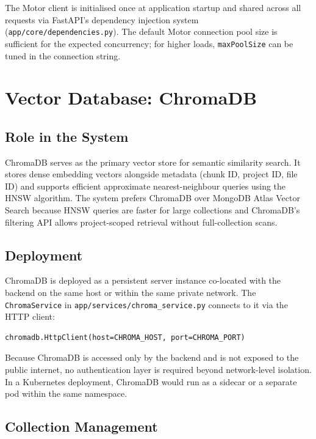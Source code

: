 The Motor client is initialised once at application startup and shared across all requests via FastAPI's dependency injection system (\texttt{app/core/dependencies.py}). The default Motor connection pool size is sufficient for the expected concurrency; for higher loads, \texttt{maxPoolSize} can be tuned in the connection string.

\section{Vector Database: ChromaDB}
\label{sec:chromadb}

\subsection{Role in the System}

ChromaDB serves as the primary vector store for semantic similarity search. It stores dense embedding vectors alongside metadata (chunk ID, project ID, file ID) and supports efficient approximate nearest-neighbour queries using the HNSW algorithm. The system prefers ChromaDB over MongoDB Atlas Vector Search because HNSW queries are faster for large collections and ChromaDB's filtering API allows project-scoped retrieval without full-collection scans.

\subsection{Deployment}

ChromaDB is deployed as a persistent server instance co-located with the backend on the same host or within the same private network. The \texttt{ChromaService} in \texttt{app/services/chroma\_service.py} connects to it via the HTTP client:

\begin{verbatim}
chromadb.HttpClient(host=CHROMA_HOST, port=CHROMA_PORT)
\end{verbatim}

Because ChromaDB is accessed only by the backend and is not exposed to the public internet, no authentication layer is required beyond network-level isolation. In a Kubernetes deployment, ChromaDB would run as a sidecar or a separate pod within the same namespace.

\subsection{Collection Management}

